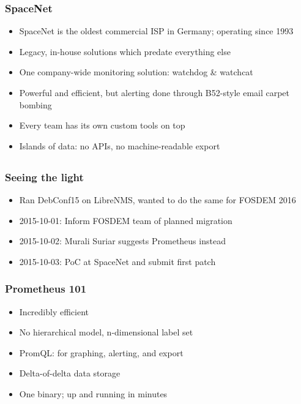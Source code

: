 \documentclass[t]{beamer}
\begin{document}
\begin{frame}
	\frametitle{SpaceNet}
	\begin{itemize}
		\item SpaceNet is the oldest commercial ISP in Germany; operating since 1993
		\item Legacy, in-house solutions which predate everything else
		\item One company-wide monitoring solution: watchdog \& watchcat
		\item Powerful and efficient, but alerting done through B52-style email carpet bombing
		\item Every team has its own custom tools on top
		\item Islands of data: no APIs, no machine-readable export
	\end{itemize}
\end{frame}

\subsection{}

\begin{frame}
	\frametitle{Seeing the light}
	\begin{itemize}
		\item Ran DebConf15 on LibreNMS, wanted to do the same for FOSDEM 2016
		\item 2015-10-01: Inform FOSDEM team of planned migration
		\item 2015-10-02: Murali Suriar suggests Prometheus instead
		\item 2015-10-03: PoC at SpaceNet and submit first patch
	\end{itemize}
\end{frame}

\begin{frame}
	\frametitle{Prometheus 101}
	\begin{itemize}
		\item Incredibly efficient
		\item No hierarchical model, n-dimensional label set
		\item PromQL: for graphing, alerting, and export
		\item Delta-of-delta data storage
		\item One binary; up and running in minutes
	\end{itemize}
\end{frame}
\end{document}

